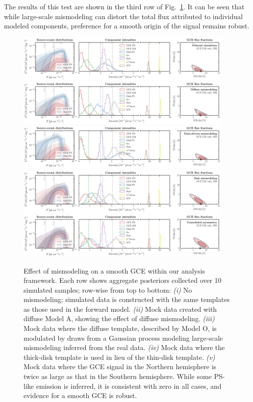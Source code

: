 \documentclass[prd,aps,10pt,nofootinbib,twocolumn,superscriptaddress,preprintnumbers,balancelastpage,longbibliography]{revtex4-1}
\begin{document}
The results of this test are shown in the third row of Fig.~\ref{fig:sim_sbi_mismo}. It can be seen that while large-scale mismodeling can distort the total flux attributed to individual modeled components, preference for a smooth origin of the signal remains robust. \\

%
\begin{figure}
\centering
\includegraphics[width=0.95\textwidth]{plots/sim_sbi_dm_agg.pdf}
\includegraphics[width=0.95\textwidth]{plots/sim_sbi_modelA_dm.pdf}
\includegraphics[width=0.95\textwidth]{plots/sim_sbi_dm_mismo.pdf}
\includegraphics[width=0.95\textwidth]{plots/sim_sbi_thick_disk_mm_dm.pdf}
\includegraphics[width=0.95\textwidth]{plots/sim_sbi_dm_asym.pdf}
\caption{Effect of mismodeling on a smooth GCE within our analysis framework. Each row shows aggregate posteriors collected over 10 simulated samples; row-wise from top to bottom: \emph{(i)} No mismodeling; simulated data is constructed with the same templates as those used in the forward model. \emph{(ii)} Mock data created with diffuse Model A, showing the effect of diffuse mismodeling. \emph{(iii)} Mock data where the diffuse template, described by Model O, is modulated by draws from a Gaussian process modeling large-scale mismodeling inferred from the real \Fermi data. \emph{(iv)} Mock data where the thick-disk template is used in lieu of the thin-disk template. \emph{(v)} Mock data where the GCE signal in the Northern hemisphere is twice as large as that in the Southern hemisphere. While some PS-like emission is inferred, it is consistent with zero in all cases, and evidence for a smooth GCE is robust.}
\label{fig:sim_sbi_mismo}
\end{figure}
%
\end{document}
